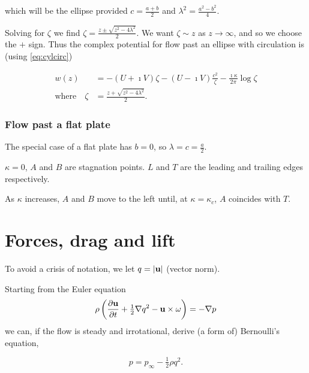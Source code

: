 \documentclass{notes}
\theoremstyle{plain}
\begin{document}
which will be the ellipse provided $c = \frac{a + b}{2}$ and
$\lambda^2 = \frac{a^2 - b^2}{4}$.

Solving for $\zeta$ we find $\zeta = \frac{z \pm \sqrt{z^2  - 4
\lambda^2}}{2}$.  We want $\zeta \sim z$ as $z \to \infty$, and so we
choose the $+$ sign.  Thus the complex potential for flow past an ellipse
with circulation is (using \eqref{eq:cylcirc})

\begin{equation}\label{eq:ellcirc}
\begin{split}
w(z) &= - \left( U + \imath V \right) \zeta - \left( U - \imath V \right)
\frac{c^2}{\zeta} - \frac{\imath \kappa}{2 \pi} \log \zeta \\
\text{where} \quad \zeta &= \frac{z + \sqrt{z^2 - 4 \lambda^2}}{2}.
\end{split}
\end{equation}

\subsubsection*{Flow past a flat plate}

The special case of a flat plate has $b = 0$, so $\lambda = c = \frac{a}{2}$.

\vspace{1in}

$\kappa = 0$, $A$ and $B$ are stagnation points.  $L$ and $T$ are the
leading and trailing edges respectively.

As $\kappa$ increases, $A$ and $B$ move to the left until, at
$\kappa = \kappa_c$, $A$ coincides with $T$.

\vspace{1in}

\section{Forces, drag and lift}

To avoid a crisis of notation, we let $q = \left|\mathbf{u}\right|$ (vector norm).

Starting from the Euler equation
\[
\rho \left( \frac{\partial \mathbf{u}}{\partial t} + \tfrac{1}{2} \nabla q^2 - \mathbf{u} \times \omega \right)
= - \nabla p
\]
we can, if the flow is steady and irrotational, derive (a form of)
Bernoulli's equation,

\begin{equation}\label{eq:stbern}
p = p_\infty - \tfrac{1}{2} \rho q^2.
\end{equation}
\end{document}
